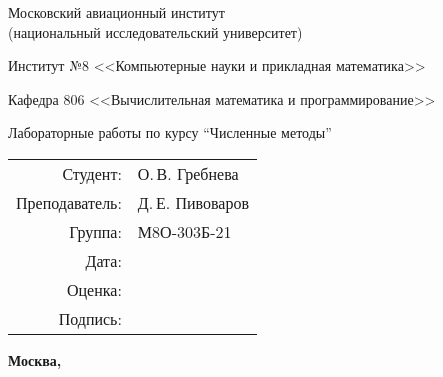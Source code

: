 \begin{titlepage}
\begin{center}
\bfseries
    
{\Large Московский авиационный институт\\ (национальный исследовательский университет)
    
}
    
\vspace{48pt}
    
{\large Институт №8 <<Компьютерные науки и прикладная математика>>
}
    
\vspace{36pt}
    
{\large Кафедра 806 <<Вычислительная математика и программирование>>
    
}
    
    
\vspace{48pt}
    
Лабораторные работы по курсу \enquote{Численные методы}
    
\end{center}
    
\vspace{72pt}
    
\begin{flushright}
\begin{tabular}{rl}
Студент: & О.\,В. Гребнева \\
Преподаватель: & Д.\,Е. Пивоваров \\
Группа: & М8О-303Б-21 \\
Дата: & \\
Оценка: & \\
Подпись: & \\
\end{tabular}
\end{flushright}
    
\vfill
    
\begin{center}
\bfseries
Москва, \the\year
\end{center}
\end{titlepage}
    
\pagebreak
    
